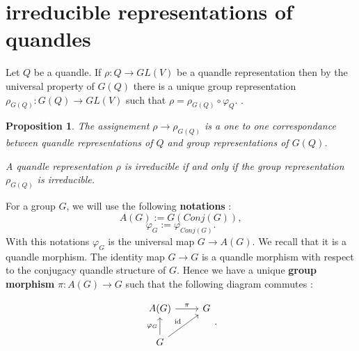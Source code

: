\documentclass[12pt, reqno]{amsart}
\newtheorem{proposition}[theorem]{Proposition}
\begin{document}
\section{irreducible representations of quandles}
Let $Q$ be a quandle.  If $\rho : Q \to GL(V)$ be a quandle representation then by the universal property of $ G(Q)$ there is a unique group representation $\rho_{G(Q)}:G(Q)\to GL(V)$ such that $\rho=\rho_{G(Q)}\circ \varphi_Q$. 
.
\begin{proposition} 
\item[1)] The assignement $\rho \to \rho_{G(Q)}$ is a one to one correspondance between quandle representations of $Q$ and group representations of $G(Q)$.
\item[2)] A quandle representation $\rho$ is irreducible if and only if the group representation $\rho_{G(Q)}$ is irreducible.
 
\end{proposition}
 
For a group $G$, we will use the following \textbf{notations} :
$$A(G):=G(Conj(G)),$$
$$\varphi_{G}:=\varphi_{Conj(G)}.$$
With this notations $\varphi_G$ is the universal map $G\to A(G)$. We recall that it is a quandle morphism. The identity map  $G\to G$ is a quandle morphism with respect to the conjugacy quandle structure of $G$. Hence we have a unique \textbf{group morphism} $\pi :A(G) \to G$ such that the following diagram commutes :

$$\begin{tikzcd}
A(G) \arrow{r}{\pi} & G  \\ 
G\arrow{u}{\varphi_G} \arrow{ru}{\mathrm{id}} & 
\end{tikzcd} .$$ 
\end{document}
